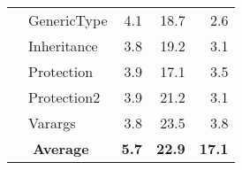 \begin{table}
\begin{tabular}{c|l|r|r|r}
& GenericType & 4.1  & 18.7 & 2.6 \\
& Inheritance & 3.8  & 19.2 & 3.1 \\
& Protection  & 3.9  & 17.1 & 3.5 \\
& Protection2 & 3.9  & 21.2 & 3.1 \\
& Varargs     & 3.8  & 23.5 & 3.8 \\
\midrule
\multicolumn{2}{c|}{\textbf{Average}}     & \textbf{5.7}  & \textbf{22.9} & \textbf{17.1} \\
\bottomrule
\end{tabular}
\end{table}
